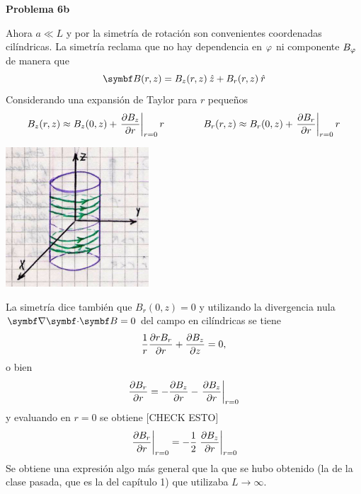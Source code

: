 \documentclass[10pt,oneside]{CBFT_book}
\begin{document}
\begin{ejemplo}{\bf Problema 6b}

Ahora $ a \ll L $ y por la simetría de rotación son convenientes coordenadas cilíndricas.
La simetría reclama que no hay dependencia en $ \varphi $ ni componente $B_\varphi$ de manera que
\[
	\vb{B}(r,z) = B_z(r,z) \zver + B_r(r,z) \rver
\]
Considerando una expansión de Taylor para $r$ pequeños
\[
	B_z(r,z) \approx B_z(0,z) + \left.\frac{\partial^{\hspace{-0.05em}} {B_z}}{\partial {r}^{\hspace{-0.05em}}}\right|_{r=0} r\qquad \qquad 
	B_r(r,z) \approx B_r(0,z) + \left.\frac{\partial^{\hspace{-0.05em}} {B_r}}{\partial {r}^{\hspace{-0.05em}}}\right|_{r=0} r
\]

\includegraphics[width=0.4\textwidth]{images/fig_ft1_problema_6b.jpg}

La simetría dice también que  $B_r(0,z) = 0$ y utilizando la divergencia nula $\divem{B}=0$ del campo en
cilíndricas se tiene 
\[
	\frac{1}{r} \frac{\partial^{\hspace{-0.05em}} {rB_r}}{\partial {r}^{\hspace{-0.05em}}} + \frac{\partial^{\hspace{-0.05em}} {B_z}}{\partial {z}^{\hspace{-0.05em}}} = 0,
\]
o bien
\[
	\frac{\partial^{\hspace{-0.05em}} {B_r}}{\partial {r}^{\hspace{-0.05em}}} = - \frac{\partial^{\hspace{-0.05em}} {B_z}}{\partial {r}^{\hspace{-0.05em}}} - \left.\frac{\partial^{\hspace{-0.05em}} {B_z}}{\partial {r}^{\hspace{-0.05em}}}\right|_{r=0}
\]
y evaluando en $r=0$ se obtiene [CHECK ESTO]
\[
	\left. \frac{\partial^{\hspace{-0.05em}} {B_r}}{\partial {r}^{\hspace{-0.05em}}} \right|_{r=0} = 
	- \frac{1}{2} \left. \frac{\partial^{\hspace{-0.05em}} {B_z}}{\partial {r}^{\hspace{-0.05em}}} \right|_{r=0}
\]
Se obtiene una expresión algo más general que la que se hubo obtenido (la de la clase pasada, que es la
del capítulo 1)  que utilizaba $ L \to \infty $.
 
\end{ejemplo}
\end{document}
